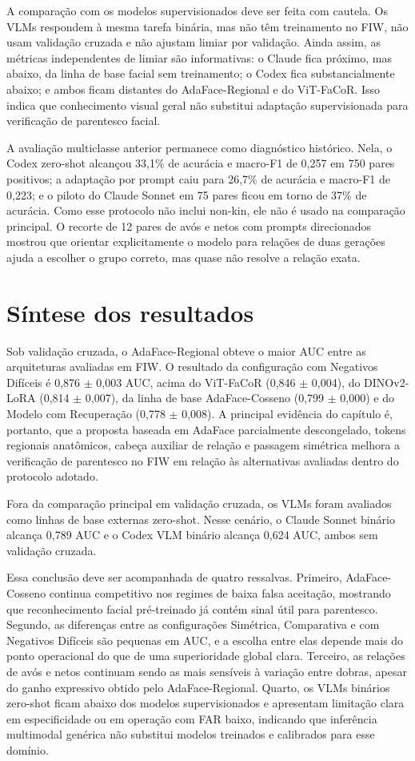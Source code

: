 A comparação com os modelos supervisionados deve ser feita com cautela. Os VLMs respondem à mesma tarefa binária, mas não têm treinamento no FIW, não usam validação cruzada e não ajustam limiar por validação. Ainda assim, as métricas independentes de limiar são informativas: o Claude fica próximo, mas abaixo, da linha de base facial sem treinamento; o Codex fica substancialmente abaixo; e ambos ficam distantes do AdaFace-Regional e do ViT-FaCoR. Isso indica que conhecimento visual geral não substitui adaptação supervisionada para verificação de parentesco facial.

A avaliação multiclasse anterior permanece como diagnóstico histórico. Nela, o Codex zero-shot alcançou 33,1\% de acurácia e macro-F1 de 0,257 em 750 pares positivos; a adaptação por prompt caiu para 26,7\% de acurácia e macro-F1 de 0,223; e o piloto do Claude Sonnet em 75 pares ficou em torno de 37\% de acurácia. Como esse protocolo não inclui non-kin, ele não é usado na comparação principal. O recorte de 12 pares de avós e netos com prompts direcionados mostrou que orientar explicitamente o modelo para relações de duas gerações ajuda a escolher o grupo correto, mas quase não resolve a relação exata.

\section{Síntese dos resultados}

Sob validação cruzada, o AdaFace-Regional obteve o maior AUC entre as arquiteturas avaliadas em FIW. O resultado da configuração com Negativos Difíceis é 0,876 $\pm$ 0,003 AUC, acima do ViT-FaCoR (0,846 $\pm$ 0,004), do DINOv2-LoRA (0,814 $\pm$ 0,007), da linha de base AdaFace-Cosseno (0,799 $\pm$ 0,000) e do Modelo com Recuperação (0,778 $\pm$ 0,008). A principal evidência do capítulo é, portanto, que a proposta baseada em AdaFace parcialmente descongelado, tokens regionais anatômicos, cabeça auxiliar de relação e passagem simétrica melhora a verificação de parentesco no FIW em relação às alternativas avaliadas dentro do protocolo adotado.

Fora da comparação principal em validação cruzada, os VLMs foram avaliados como linhas de base externas zero-shot. Nesse cenário, o Claude Sonnet binário alcança 0,789 AUC e o Codex VLM binário alcança 0,624 AUC, ambos sem validação cruzada.

Essa conclusão deve ser acompanhada de quatro ressalvas. Primeiro, AdaFace-Cosseno continua competitivo nos regimes de baixa falsa aceitação, mostrando que reconhecimento facial pré-treinado já contém sinal útil para parentesco. Segundo, as diferenças entre as configurações Simétrica, Comparativa e com Negativos Difíceis são pequenas em AUC, e a escolha entre elas depende mais do ponto operacional do que de uma superioridade global clara. Terceiro, as relações de avós e netos continuam sendo as mais sensíveis à variação entre dobras, apesar do ganho expressivo obtido pelo AdaFace-Regional. Quarto, os VLMs binários zero-shot ficam abaixo dos modelos supervisionados e apresentam limitação clara em especificidade ou em operação com FAR baixo, indicando que inferência multimodal genérica não substitui modelos treinados e calibrados para esse domínio.
